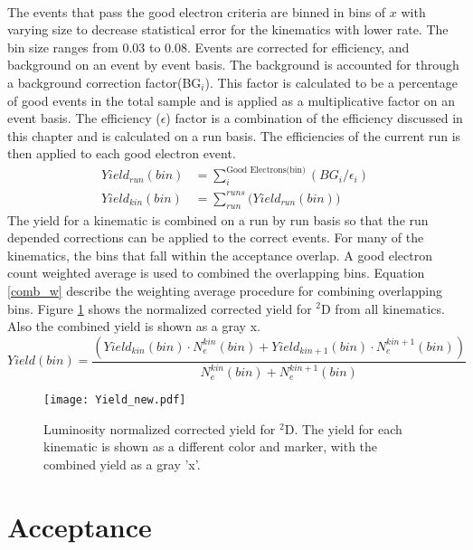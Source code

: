\paragraph{}The events that pass the good electron criteria are binned in bins of $x$ with varying size to decrease statistical error for the kinematics with lower rate. The bin size ranges from 0.03 to 0.08. Events are corrected for efficiency, and background on an event by event basis. The background is accounted for through a background correction factor(BG$_i$). This factor is calculated to be a percentage of good events in the total sample and is applied as a multiplicative factor on an event basis. The efficiency ($\epsilon$) factor is a combination of the efficiency discussed in this chapter and is calculated on a run basis. The efficiencies of the current run is then applied to each good electron event. 
\begin{align}
Yield_{run}(bin) &= \sum_{i}^{\text{Good Electrons(bin)} } \left( BG_{i}/\epsilon_{i} \right) \nonumber\\
Yield_{kin}(bin) &= \sum_{run}^{runs} \bigg( Yield_{run}(bin) \bigg)
\end{align}
The yield for a kinematic is combined on a run by run basis so that the run depended corrections can be applied to the correct events. For many of the kinematics, the bins that fall within the acceptance overlap. A good electron count weighted average is used to combined the overlapping bins. Equation \ref{comb_w} describe the weighting average procedure for combining overlapping bins. Figure \ref{kinYield} shows the normalized corrected yield for $^2$D from all kinematics. Also the combined yield is shown as a gray x. 
\begin{equation}
Yield(bin) = \frac{\left( Yield_{kin}(bin)\cdot N_e^{kin}(bin)+ Yield_{kin+1}(bin)\cdot N_e^{kin+1}(bin) \right)}{N_e^{kin}(bin)+N_e^{kin+1}(bin)} \label{comb_w}
\end{equation}
\begin{figure}
	\texttt{[image: Yield\_new.pdf]}
		\caption{Luminosity normalized corrected yield for $^2$D. The yield for each kinematic is shown as a different color and marker, with the combined yield as a gray 'x'.  \label{kinYield}}
\end{figure}
\section{Acceptance } 
